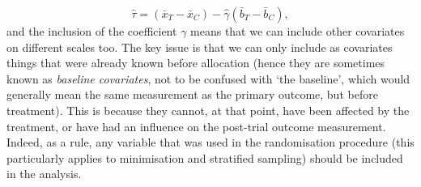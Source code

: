 \documentclass[
  openany]{book}
\theoremstyle{definition}
\theoremstyle{definition}
\theoremstyle{definition}
\theoremstyle{definition}
\theoremstyle{remark}
\begin{document}
\[ \hat\tau = \left(\bar{x}_T - \bar{x}_C\right) - \hat\gamma\left(\bar{b}_T - \bar{b}_C\right), \]
and the inclusion of the coefficient \(\gamma\) means that we can include other covariates on different scales too. The key issue is that we can only include as covariates things that were already known before allocation (hence they are sometimes known as \emph{baseline covariates}, not to be confused with `the baseline', which would generally mean the same measurement as the primary outcome, but before treatment). This is because they cannot, at that point, have been affected by the treatment, or have had an influence on the post-trial outcome measurement. Indeed, as a rule, any variable that was used in the randomisation procedure (this particularly applies to minimisation and stratified sampling) should be included in the analysis.
\end{document}
